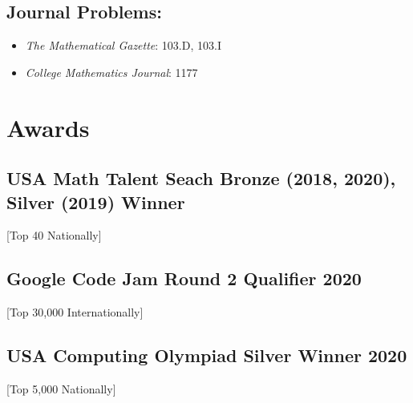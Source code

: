 \documentclass{mycv}
\begin{document}
\subsection{Journal Problems:}
\begin{itemize}
  \item \textit{The Mathematical Gazette}: 103.D, 103.I
  \item \textit{College Mathematics Journal}: 1177

\end{itemize}


\section{Awards}
\subsection{USA Math Talent Seach Bronze (2018, 2020), Silver (2019) Winner}[Top 40 Nationally]
\subsection{Google Code Jam Round 2 Qualifier 2020}[Top 30,000 Internationally]
\subsection{USA Computing Olympiad Silver Winner 2020}[Top 5,000 Nationally]
\end{document}
